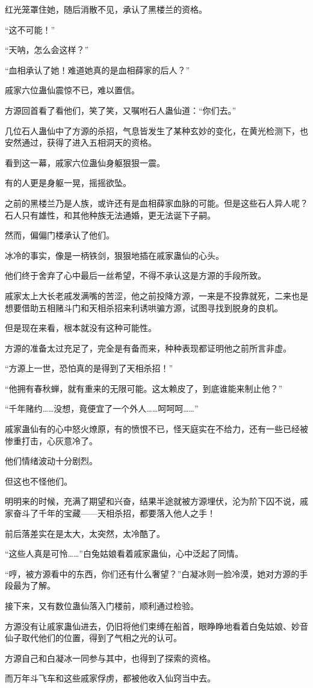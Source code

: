 \begin{this_body}
红光笼罩住她，随后消散不见，承认了黑楼兰的资格。

“这不可能！”

“天呐，怎么会这样？”

“血相承认了她！难道她真的是血相薛家的后人？”

戚家六位蛊仙震惊不已，难以置信。

方源回首看了看他们，笑了笑，又嘱咐石人蛊仙道：“你们去。”

几位石人蛊仙中了方源的杀招，气息皆发生了某种玄妙的变化，在黄光检测下，也安然通过，获得了进入五相洞天的资格。

看到这一幕，戚家六位蛊仙身躯狠狠一震。

有的人更是身躯一晃，摇摇欲坠。

之前的黑楼兰乃是人族，或许还有是血相薛家血脉的可能。但是这些石人异人呢？石人只有雄性，和其他种族无法通婚，更无法诞下子嗣。

然而，偏偏门楼承认了他们。

冰冷的事实，像是一柄铁剑，狠狠地插在戚家蛊仙的心头。

他们终于舍弃了心中最后一丝希望，不得不承认这是方源的手段所致。

戚家太上大长老戚发满嘴的苦涩，他之前投降方源，一来是不投靠就死，二来也是想要借助五相赌斗门和天相杀招来利诱哄骗方源，试图寻找到脱身的良机。

但是现在来看，根本就没有这种可能性。

方源的准备太过充足了，完全是有备而来，种种表现都证明他之前所言非虚。

“方源上一世，恐怕真的是得到了天相杀招！”

“他拥有春秋蝉，就有重来的无限可能。这太赖皮了，到底谁能来制止他？”

“千年赌约……没想，竟便宜了一个外人……呵呵呵……”

戚家蛊仙有的心中怒火燎原，有的愤恨不已，怪天庭实在不给力，还有一些已经被惨重打击，心灰意冷了。

他们情绪波动十分剧烈。

但这也不怪他们。

明明来的时候，充满了期望和兴奋，结果半途就被方源埋伏，沦为阶下囚不说，戚家奋斗了千年的宝藏——天相杀招，都要落入他人之手！

前后落差实在是太大，太突然，太冷酷了。

“这些人真是可怜……”白兔姑娘看着戚家蛊仙，心中泛起了同情。

“哼，被方源看中的东西，你们还有什么奢望？”白凝冰则一脸冷漠，她对方源的手段最为了解。

接下来，又有数位蛊仙落入门楼前，顺利通过检验。

方源没有让戚家蛊仙进去，仍旧将他们束缚在船首，眼睁睁地看着白兔姑娘、妙音仙子取代他们的位置，得到了气相之光的认可。

方源自己和白凝冰一同参与其中，也得到了探索的资格。

而万年斗飞车和这些戚家俘虏，都被他收入仙窍当中去。

\end{this_body}

